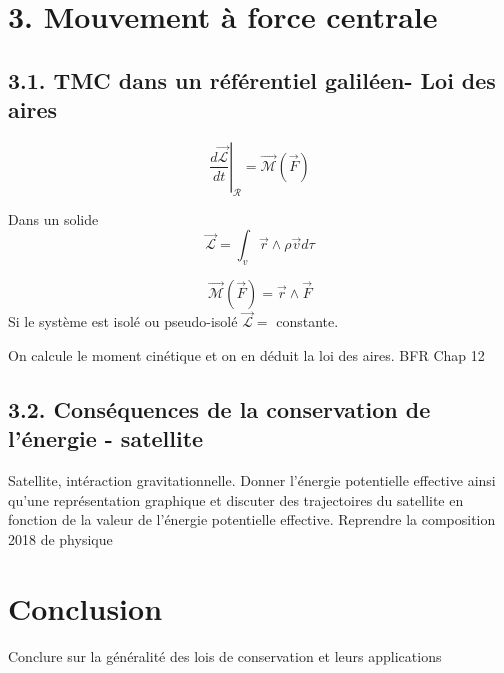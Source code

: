 \documentclass[french, a4paper, 10pt, twocolumn, landscape]{article}
\begin{document}
\section*{3. Mouvement à force centrale}

\subsection*{3.1. TMC dans un référentiel galiléen- Loi des aires}

\begin{equation}
    \left.\dfrac{d\vec{\mathcal{L}}}{dt}\right|_{\mathcal{R}} = \vec{\mathcal{M}}(\vec{F})
\end{equation}

Dans un solide
\begin{equation}
    \vec{\mathcal{L}} = \int_{v}\vec{r}\wedge \rho \vec{v} d\tau 
\end{equation}

\begin{equation}
    \vec{\mathcal{M}}(\vec{F})=\vec{r}\wedge\vec{F}
\end{equation}
Si le système est isolé ou pseudo-isolé $\vec{\mathcal{L}}=$ constante.

On calcule le moment cinétique et on en déduit la loi des aires. BFR Chap 12
\subsection*{3.2. Conséquences de la conservation de l'énergie - satellite}


Satellite, intéraction gravitationnelle. Donner l'énergie potentielle effective ainsi qu'une représentation graphique et discuter des trajectoires du satellite en fonction de la valeur de l'énergie potentielle effective.  Reprendre la composition 2018 de physique

\section*{Conclusion}
Conclure sur la généralité des lois de conservation et leurs applications 
\end{document}
